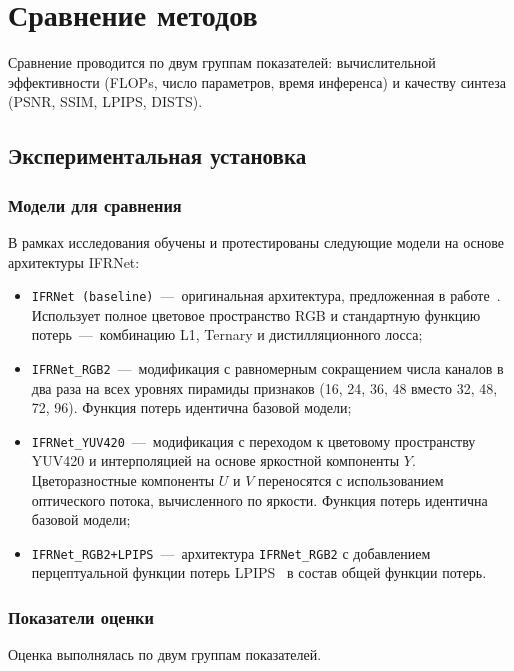 \chapter{Сравнение методов}

Сравнение проводится по двум группам показателей: вычислительной эффективности (FLOPs, число параметров, время инференса) и качеству синтеза (PSNR, SSIM, LPIPS, DISTS).

\section{Экспериментальная установка}

\subsection*{Модели для сравнения}

В рамках исследования обучены и протестированы следующие модели на основе архитектуры IFRNet:
\begin{itemize}
	\item \texttt{IFRNet (baseline)}~---~оригинальная архитектура, предложенная в работе~\cite{IFRNet2022}. Использует полное цветовое пространство RGB и стандартную функцию потерь~---~комбинацию L1, Ternary и дистилляционного лосса;

	\item \texttt{IFRNet\_RGB2}~---~модификация с равномерным сокращением числа каналов в два раза на всех уровнях пирамиды признаков (16, 24, 36, 48 вместо 32, 48, 72, 96). Функция потерь идентична базовой модели;

	\item \texttt{IFRNet\_YUV420}~---~модификация с переходом к цветовому пространству YUV420 и интерполяцией на основе яркостной компоненты $Y$. Цветоразностные компоненты $U$ и $V$ переносятся с использованием оптического потока, вычисленного по яркости. Функция потерь идентична базовой модели;

	\item \texttt{IFRNet\_RGB2+LPIPS}~---~архитектура \texttt{IFRNet\_RGB2} с добавлением перцептуальной функции потерь LPIPS~\cite{zhang2018} в состав общей функции потерь.
\end{itemize}

\subsection*{Показатели оценки}

Оценка выполнялась по двум группам показателей.

